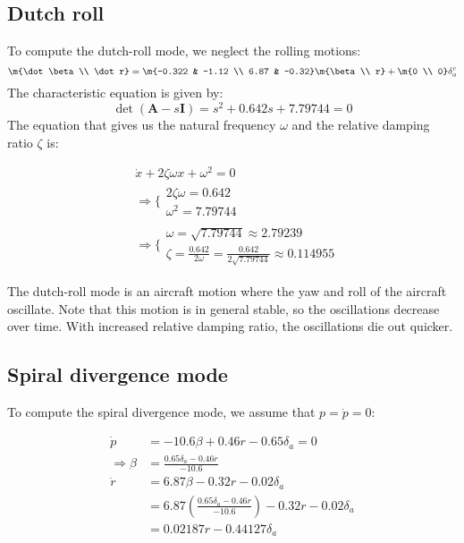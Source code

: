 \subsection{Dutch roll}
To compute the dutch-roll mode, we neglect the rolling motions\cite{beard}:
\begin{equation*}
    \m{\dot \beta \\ \dot r} = \m{-0.322 & -1.12 \\ 6.87 & -0.32} \m{\beta \\ r} + \m{0 \\ 0} \delta^c_a \\
\end{equation*}
The characteristic equation is given by:
\begin{equation*}
    \det (\mathbf{A} - s\mathbf{I}) =  s^2 + 0.642 s + 7.79744 = 0 
\end{equation*}
The equation that gives us the natural frequency $\omega$ and the relative damping ratio $\zeta$ is:
\begin{equations}
    \begin{align*}
        &\dot x + 2\zeta\omega x + \omega^2 = 0\\
        &\Rightarrow \bigg\{
        \begin{array}{ll}
            2 \zeta \omega = 0.642 \\
            \omega^2 = 7.79744
        \end{array}\\
        &\Rightarrow \bigg\{
        \begin{array}{ll}
            \omega = \sqrt{7.79744} \approx 2.79239\\
            \zeta = \frac{0.642}{2 \omega} = \frac{0.642}{2 \sqrt{7.79744}} \approx 0.114955
        \end{array}
    \end{align*}
\end{equations}

The dutch-roll mode is an aircraft motion where the yaw and roll of the aircraft oscillate. Note that this motion is in general stable, so the oscillations decrease over time. With increased relative damping ratio, the oscillations die out quicker. 




\subsection{Spiral divergence mode}
To compute the spiral divergence mode, we assume that $p = \dot p = 0$:
\begin{equations}
    \begin{align*}
        \dot p &=  -10.6 \beta + 0.46 r -0.65 \delta _a = 0 \\
        \Rightarrow \beta &= \frac{0.65 \delta_a - 0.46 r}{-10.6} \\
        \dot r &= 6.87 \beta - 0.32 r -0.02\delta_a \\
        &= 6.87 (\frac{0.65 \delta_a - 0.46 r}{-10.6}) - 0.32 r - 0.02 \delta_a \\
        &= 0.02187 r - 0.44127 \delta _a 
    \end{align*}
\end{equations}

